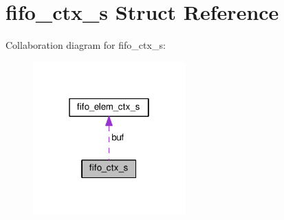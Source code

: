 \hypertarget{structfifo__ctx__s}{}\section{fifo\+\_\+ctx\+\_\+s Struct Reference}
\label{structfifo__ctx__s}


Collaboration diagram for fifo\+\_\+ctx\+\_\+s\+:\nopagebreak
\begin{figure}[H]
\begin{center}
\leavevmode
\includegraphics[width=166pt]{structfifo__ctx__s__coll__graph}
\end{center}
\end{figure}
